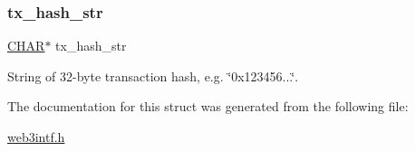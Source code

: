 \subsubsection{\texorpdfstring{tx\+\_\+hash\+\_\+str}{tx\_hash\_str}}
{\footnotesize\ttfamily \mbox{\hyperlink{boattypes_8h_aebb9e13210d88d43e32e735ada43a425}{C\+H\+AR}}$\ast$ tx\+\_\+hash\+\_\+str}



String of 32-\/byte transaction hash, e.\+g. \char`\"{}0x123456...\char`\"{}. 



The documentation for this struct was generated from the following file\+:\begin{DoxyCompactItemize}
\item 
\mbox{\hyperlink{web3intf_8h}{web3intf.\+h}}\end{DoxyCompactItemize}
